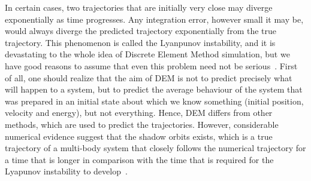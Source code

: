 In certain cases, two trajectories that are initially very close may diverge 
exponentially as time progresses. Any integration error, however small it may 
be, would always diverge the predicted trajectory exponentially from the true 
trajectory. This phenomenon is called the Lyanpunov instability, and it is 
devastating to the whole idea of Discrete Element Method simulation, but we 
have good reasons to assume that even this problem need not be 
serious~\citep{Frenkel1996}. First of all, one should realize that 
the aim of DEM is not to predict precisely what will happen to a system, but 
to predict the average behaviour of the system that was prepared in an initial 
state about which we know something (initial position, velocity and energy), 
but not everything. Hence, DEM differs from other methods, which are used to 
predict the trajectories. However, considerable numerical evidence suggest that 
the shadow orbits exists, which is a true trajectory of a multi-body system 
that closely follows the numerical trajectory for a time that is longer in 
comparison with the time that is required for the Lyapunov instability to 
develop~\citep{Frenkel1996}.


